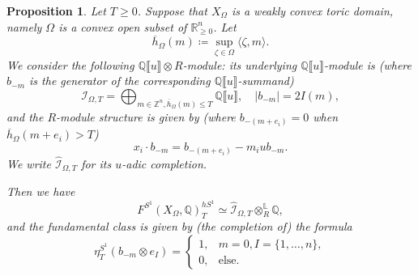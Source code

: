 \documentclass[11pt]{amsart}
\numberwithin{equation}{section}
\theoremstyle{plain}
\newtheorem{Prop}[prop]{Proposition}
\theoremstyle{definition}
\theoremstyle{remark}
\newcommand{\bQ} { {\mathbb{Q}}}
\newcommand{\bZ} { {\mathbb{Z}}}
\newcommand{\fpw}[1]{{\llbracket #1\rrbracket}}
\begin{document}
\begin{Prop}\label{prop: weakly convex cohomology}Let $T\geq 0$. Suppose that $X_{\Omega}$ is a weakly convex toric domain, namely $\Omega$ is a convex open subset of $\mathbb R_{\geq 0}^n$. Let 
\[\overline{h}_\Omega(m)\coloneqq \sup_{\zeta\in \Omega}\langle \zeta,m\rangle.\]
We consider the following $\bQ\fpw{u}\otimes R$-module: its underlying $\bQ\fpw{u}$-module is (where $b_{-m}$ is the generator of the corresponding $\bQ\fpw{u}$-summand)
\[\mathcal{I}_{\Omega,T}=\bigoplus_{m\in \bZ^n, \overline{h}_\Omega(m)\leq T} \bQ\fpw{u}, \quad |b_{-m}|=2I(m),\]
and the $R$-module structure is given by (where $b_{-(m+e_i)}=0$ when $\overline{h}_\Omega(m+e_i)> T$)
\[x_i\cdot b_{-m}=b_{-(m+e_i)}-m_i u b_{-m}.\]
We write $\widehat{\mathcal{I}}_{\Omega,T}$ for its $u$-adic completion.

Then we have
\[F^{S^1}(X_\Omega,\bQ)_T^{hS^1}\simeq \widehat{\mathcal{I}}_{\Omega,T}\otimes^\mathbb{L}_R\bQ ,\]
and the fundamental class is given by (the completion of) the formula 
\[\eta_{T}^{S^1}(b_{-m}\otimes e_I)=\begin{cases}
    1,&m=0,I=\{1,\dots, n\},\\
    0,&\text{else.}
\end{cases}\]
\end{Prop}
\end{document}
